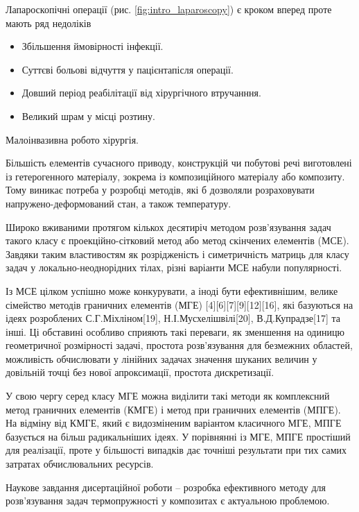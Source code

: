 Лапароскопічні операції (рис. \ref{fig:intro_laparoscopy}) є кроком вперед проте мають ряд недоліків
\begin{itemize}
  \item Збільшення ймовірності інфекції.
  \item Суттєві больові відчуття у пацієнта після операції.
  \item Довший період реабілітації від хірургічного втручанння.
  \item Великий шрам у місці розтину.
\end{itemize}

Малоінвазивна робото хірургія. 


Більшість елементів сучасного приводу, конструкцій чи побутові речі виготовлені із гетерогенного матеріалу, зокрема із композиційного матеріалу або композиту. Тому виникає потреба у розробці методів, які б дозволяли розраховувати напружено-деформований стан, а також температуру.

Широко вживаними протягом кількох десятиріч методом розв'язування задач такого класу є проекційно-сітковий метод або метод скінчених елементів (МСЕ). Завдяки таким властивостям як розрідженість і симетричність матриць для класу задач у локально-неоднорідних тілах, різні варіанти МСЕ набули популярності.

Із МСЕ цілком успішно може конкурувати, а іноді бути ефективнішим,
велике сімейство методів граничних елементів
(МГЕ) \cite{benerdge-et-al} {[}4{]}{[}6{]}{[}7{]}{[}9{]}{[}12{]}{[}16{]}, які базуються
на ідеях розроблених С.Г.Міхліном{[}19{]}, Н.І.Мусхелішвілі{[}20{]},
В.Д.Купрадзе{[}17{]} та інші. Ці обставині особливо сприяють такі
переваги, як зменшення на одиницю геометричної розмірності задачі,
простота розв'язування для безмежних областей, можливість обчислювати у
лінійних задачах значення шуканих величин у довільній точці без нової
апроксимації, простота дискретизації.

У свою чергу серед класу МГЕ можна виділити такі методи як комплексний
метод граничних елементів (КМГЕ) і метод при граничних елементів (МПГЕ).
На відміну від КМГЕ, який є видозміненим варіантом класичного МГЕ, МПГЕ
базується на більш радикальніших ідеях. У порівнянні із МГЕ, МПГЕ
простіший для реалізації, проте у більшості випадків дає точніші
результати при тих самих затратах обчислювальних ресурсів.

Наукове завдання дисертаційної роботи -- розробка ефективного методу для
розв'язування задач термопружності у композитах є актуальною проблемою.


